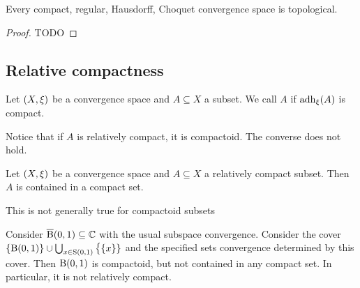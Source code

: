 \begin{proposition} \label{T3pseudotopologyTopological}
Every compact, regular, Hausdorff, Choquet convergence space is topological.
\end{proposition}
\begin{proof}
TODO
\end{proof}



\subsection{Relative compactness}
\begin{definition}
Let $\left( X,\xi \right)$ be a convergence space and $A\subseteq X$ a subset. We call $A$  if $\operatorname{adh}_\xi(A)$ is compact.
\end{definition}

Notice that if $A$ is relatively compact, it is compactoid. The converse does not hold.

\begin{lemma}
Let $\left( X,\xi \right)$ be a convergence space and $A\subseteq X$ a relatively compact subset. Then $A$ is contained in a compact set.
\end{lemma}
This is not generally true for compactoid subsets

\begin{example}
Consider $\operatorname{\overline{B}}(0,1)\subseteq \mathbb{C}$ with the usual subspace convergence. Consider the cover $\{\operatorname{B}(0,1)\}\cup \bigcup_{x\in \operatorname{S}(0,1)}\big\{\{x\}\}$ and the specified sets convergence determined by this cover. Then $\operatorname{B}(0,1)$ is compactoid, but not contained in any compact set.
In particular, it is not relatively compact.
\end{example}


